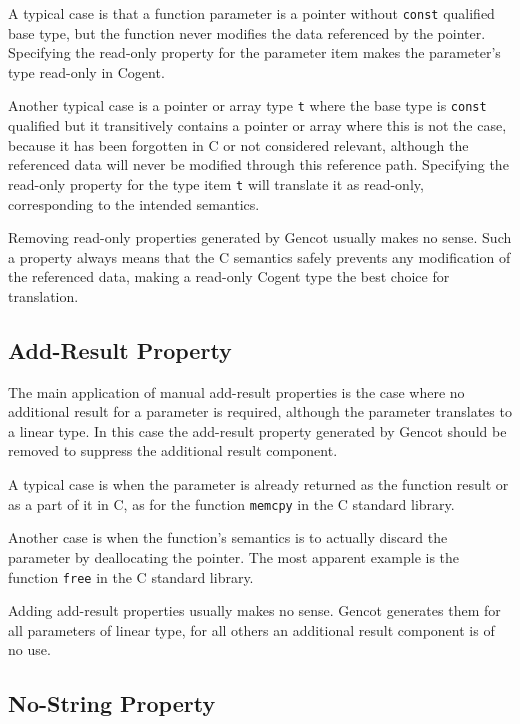 \documentclass[a4paper]{report}
\newcommand{\code}[1]{\textnormal{\texttt{#1}}}
\begin{document}
A typical case is that a function parameter is a pointer without \code{const} qualified base type, but the function 
never modifies the data referenced by the pointer. Specifying the read-only property for the parameter item makes 
the parameter's type read-only in Cogent.

Another typical case is a pointer or array type \code{t} where the base type is \code{const} qualified but it transitively contains
a pointer or array where this is not the case, because it has been forgotten in C or not considered relevant, although
the referenced data will never be modified through this reference path. Specifying the read-only property for the type
item \code{t} will translate it as read-only, corresponding to the intended semantics.

Removing read-only properties generated by Gencot usually makes no sense. Such a property always means that the C semantics safely
prevents any modification of the referenced data, making a read-only Cogent type the best choice for translation.

\subsection{Add-Result Property}
\label{types-manprops-ar}

The main application of manual add-result properties is the case where no additional result for a parameter is required, although
the parameter translates to a linear type. In this case the add-result property generated by Gencot should be removed 
to suppress the additional result component.

A typical case is when the parameter is already returned as the function result or as a part of it in C, as for the function
\code{memcpy} in the C standard library. 

Another case is when the function's semantics is to actually discard the parameter by deallocating the pointer. The most
apparent example is the function \code{free} in the C standard library.

Adding add-result properties usually makes no sense. Gencot generates them for all parameters of linear type, for all others
an additional result component is of no use.

\subsection{No-String Property}
\label{types-manprops-ns}
\end{document}
